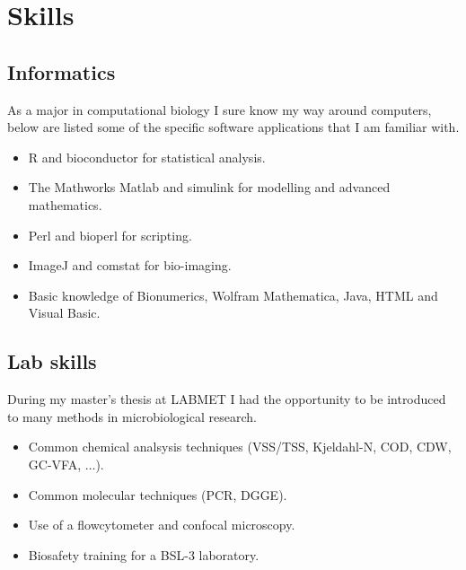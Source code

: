 \documentclass[a4paper,11pt,oneside]{article}
\begin{document}
\section{Skills}
\subsection{Informatics}
As a major in computational biology I sure know my way around computers, below are listed some of the specific software applications that I am familiar with.
\begin{itemize}
	\item R and bioconductor for statistical analysis.
	\item The Mathworks Matlab and simulink for modelling and advanced mathematics.
	\item Perl and bioperl for scripting.
	\item ImageJ and comstat for bio-imaging.
	\item Basic knowledge of Bionumerics, Wolfram Mathematica, Java, HTML and Visual Basic.
\end{itemize}
\subsection{Lab skills}
During my master's thesis at LABMET I had the opportunity to be introduced to many methods in microbiological research.
\begin{itemize}
	\item Common chemical analsysis techniques (VSS/TSS, Kjeldahl-N, COD, CDW, GC-VFA, $\ldots$).
	\item Common molecular techniques (PCR, DGGE).
	\item Use of a flowcytometer and confocal microscopy.
	\item Biosafety training for a BSL-3 laboratory.
\end{itemize}
\end{document}

